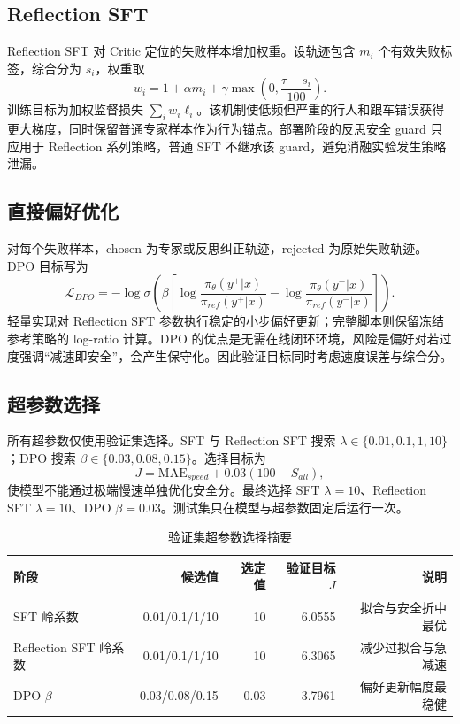 \documentclass[UTF8,a4paper,12pt,fontset=fandol]{ctexart}
\begin{document}
\subsection{Reflection SFT}
Reflection SFT 对 Critic 定位的失败样本增加权重。设轨迹包含 $m_i$ 个有效失败标签，综合分为 $s_i$，权重取
\begin{equation}
w_i=1+\alpha m_i+\gamma\max\left(0,\frac{\tau-s_i}{100}\right).
\end{equation}
训练目标为加权监督损失 $\sum_i w_i\ell_i$。该机制使低频但严重的行人和跟车错误获得更大梯度，同时保留普通专家样本作为行为锚点。部署阶段的反思安全 guard 只应用于 Reflection 系列策略，普通 SFT 不继承该 guard，避免消融实验发生策略泄漏。

\subsection{直接偏好优化}
对每个失败样本，chosen 为专家或反思纠正轨迹，rejected 为原始失败轨迹。DPO 目标写为
\begin{equation}
\mathcal{L}_{DPO}=-\log\sigma\left(\beta\left[\log\frac{\pi_\theta(y^+|x)}{\pi_{ref}(y^+|x)}-
\log\frac{\pi_\theta(y^-|x)}{\pi_{ref}(y^-|x)}\right]\right).
\end{equation}
轻量实现对 Reflection SFT 参数执行稳定的小步偏好更新；完整脚本则保留冻结参考策略的 log-ratio 计算。DPO 的优点是无需在线闭环环境，风险是偏好对若过度强调“减速即安全”，会产生保守化。因此验证目标同时考虑速度误差与综合分。

\subsection{超参数选择}
所有超参数仅使用验证集选择。SFT 与 Reflection SFT 搜索 $\lambda\in\{0.01,0.1,1,10\}$；DPO 搜索 $\beta\in\{0.03,0.08,0.15\}$。选择目标为
\begin{equation}
J=\mathrm{MAE}_{speed}+0.03(100-S_{all}),
\end{equation}
使模型不能通过极端慢速单独优化安全分。最终选择 SFT $\lambda=10$、Reflection SFT $\lambda=10$、DPO $\beta=0.03$。测试集只在模型与超参数固定后运行一次。

\begin{table}[!htbp]
\centering\small
\caption{验证集超参数选择摘要}
\begin{tabular}{lrrrr}
\toprule
阶段 & 候选值 & 选定值 & 验证目标 $J$ & 说明 \\
\midrule
SFT 岭系数 & 0.01/0.1/1/10 & 10 & 6.0555 & 拟合与安全折中最优 \\
Reflection SFT 岭系数 & 0.01/0.1/1/10 & 10 & 6.3065 & 减少过拟合与急减速 \\
DPO $\beta$ & 0.03/0.08/0.15 & 0.03 & 3.7961 & 偏好更新幅度最稳健 \\
\bottomrule
\end{tabular}
\end{table}
\end{document}
